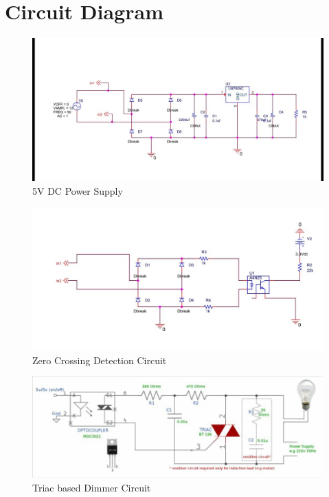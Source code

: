         \section{Circuit Diagram}
        	\begin{figure}[h!]
        		\includegraphics[width=\textwidth]{photos/ckt-dgm/5VDCPowerSupply.jpg}
        		\caption{5V DC Power Supply}
        	\end{figure}
	        \begin{figure}[h!]
	        	\includegraphics[width=\textwidth]{photos/ckt-dgm/ZeroCrossingCircuit.jpg}
	        	\caption{Zero Crossing Detection Circuit}
	        \end{figure}
		    \begin{figure}[h!]
		    	\includegraphics[width=\textwidth]{photos/ckt-dgm/LightDimmerCircuit.jpg}
		    	\caption{Triac based Dimmer Circuit}
		    \end{figure}
